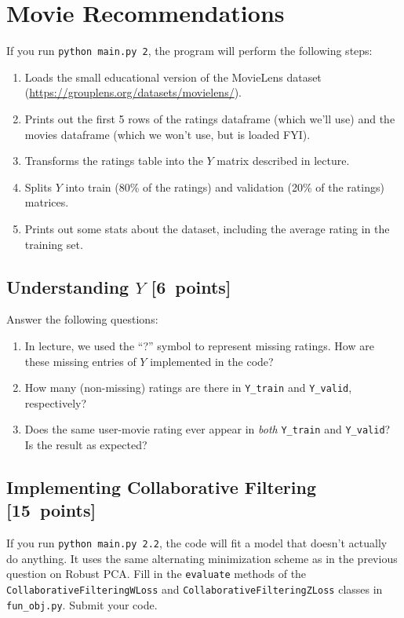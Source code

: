 \documentclass{article}
\newcommand{\blu}[1]{{\textcolor{blu}{#1}}}
\let\ask\blu
\newcommand\pts[1]{\textcolor{pointscolour}{[#1~points]}}
\begin{document}
\section{Movie Recommendations}

If you run \texttt{python main.py 2}, the program will perform the following steps:

\begin{enumerate}
\item Loads the small educational version of the MovieLens dataset (\url{https://grouplens.org/datasets/movielens/}).
\item Prints out the first 5 rows of the ratings dataframe (which we'll use) and the movies dataframe (which we won't use, but is loaded FYI).
\item Transforms the ratings table into the $Y$ matrix described in lecture.
\item Splits $Y$ into train (80\% of the ratings) and validation (20\% of the ratings) matrices.
\item Prints out some stats about the dataset, including the average rating in the training set.
\end{enumerate}

\subsection{Understanding $Y$ \pts{6}}

\ask{Answer the following questions:}

\begin{enumerate}
\item In lecture, we used the ``?'' symbol to represent missing ratings. How are these missing entries of $Y$ implemented in the code?
\item How many (non-missing) ratings are there in \texttt{Y\_train} and \texttt{Y\_valid}, respectively?
\item Does the same user-movie rating ever appear in \emph{both} \texttt{Y\_train} and \texttt{Y\_valid}? Is the result as expected?
\end{enumerate}


\subsection{Implementing Collaborative Filtering \pts{15}}

If you run \texttt{python main.py 2.2}, the code will fit a model that doesn't actually do anything. It uses the same alternating minimization scheme as in the previous question on Robust PCA. \ask{Fill in the \texttt{evaluate} methods of the \texttt{CollaborativeFilteringWLoss} and \texttt{CollaborativeFilteringZLoss} classes in \texttt{fun\_obj.py}. Submit your code.}
\end{document}

